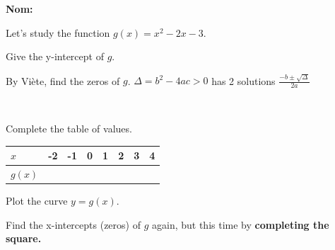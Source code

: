 \documentclass[8pt]{exam}
\begin{document}
\textbf{Nom:} \dotfill

\begin{center}
Let's study the function $g( x ) = x^2 -  2x - 3.$
\end{center}

\begin{questions}


\question[1] Give the y-intercept of $g$. \dotfill

\question[3] By Viète, find the zeros of $g$. \hfill $\Delta = b^2 - 4ac >0$ has 2 solutions $\frac{-b\pm\sqrt{\Delta}}{2a}$
\fillwithdottedlines{5cm}

\

\question[1] Complete the table of values.
\renewcommand{\arraystretch}{1.75}
\begin{tabular}{|l|l|l|l|l|l|l|l|}
\hline
$x$    & -2 & -1 & 0 & 1 & 2 & 3 & 4   \\ \hline
$g(x)$ &   \hspace{7mm}  &   \hspace{7mm}   & \hspace{7mm}   &   \hspace{7mm}   &  \hspace{7mm}  & \hspace{7mm}   &  \hspace{7mm}  \\ \hline
\end{tabular}

\vspace{4mm}

\begin{minipage}{0.5\textwidth}
\question[2] Plot the curve $y = g(x)$.

\begin{center}
\end{center}
\end{minipage}
\begin{minipage}{0.5\textwidth}
\question[1] Find the x-intercepts (zeros) of $g$ again, but this time by \textbf{completing the square.}
\fillwithdottedlines{63mm}


\end{minipage}
\end{questions}
\end{document}
